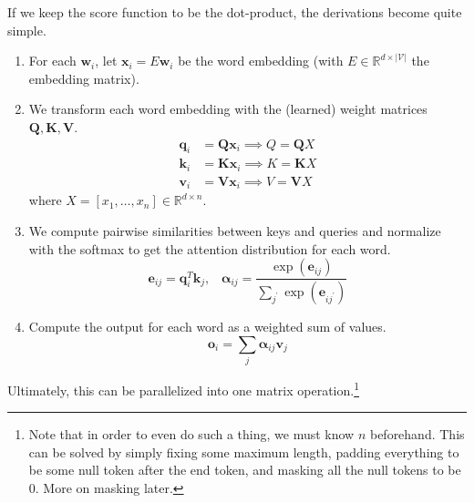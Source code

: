       \begin{definition}
        If we keep the score function to be the dot-product, the derivations become quite simple. 
        \begin{enumerate}
          \item For each $\mathbf{w}_i$, let $\mathbf{x}_i = E \mathbf{w}_i$ be the word embedding (with $E \in \mathbb{R}^{d \times |\mathcal{V}|}$ the embedding matrix). 

          \item We transform each word embedding with the (learned) weight matrices $\mathbf{Q}, \mathbf{K}, \mathbf{V}$. 
          \begin{align*} 
            \mathbf{q}_i & = \mathbf{Q} \mathbf{x}_i \implies Q = \mathbf{Q} X \\
            \mathbf{k}_i & = \mathbf{K} \mathbf{x}_i \implies K = \mathbf{K} X \\
            \mathbf{v}_i & = \mathbf{V} \mathbf{x}_i \implies V = \mathbf{V} X 
          \end{align*}
          where $X = [x_1, \ldots, x_n] \in \mathbb{R}^{d \times n}$.  

          \item We compute pairwise similarities between keys and queries and normalize with the softmax to get the attention distribution for each word. 
            \begin{equation}
              \mathbf{e}_{ij} = \mathbf{q}_i^T \mathbf{k}_j , \;\;\; \boldsymbol{\alpha}_{ij} = \frac{\exp(\mathbf{e}_{ij})}{\sum_{j^\prime} \exp(\mathbf{e}_{i j^\prime})}
            \end{equation}

          \item Compute the output for each word as a weighted sum of values. 
            \begin{equation}
              \mathbf{o}_i = \sum_j \boldsymbol{\alpha}_{ij} \mathbf{v}_j 
            \end{equation}
        \end{enumerate}

        Ultimately, this can be parallelized into one matrix operation.\footnote{Note that in order to even do such a thing, we must know $n$ beforehand. This can be solved by simply fixing some maximum length, padding everything to be some null token after the end token, and masking all the null tokens to be $0$. More on masking later. } 


\end{definition}
